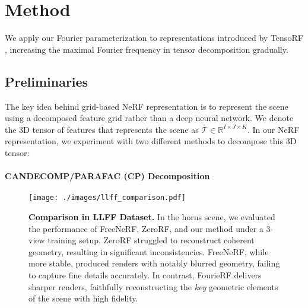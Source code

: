 \section{Method}
\label{sec: method}

We apply our Fourier parameterization to representations introduced by TensoRF \cite{Chen2022ECCV}, increasing the maximal Fourier frequency in tensor decomposition gradually.


\subsection{Preliminaries}


The key idea behind grid-based NeRF representation is to represent the scene using a decomposed feature grid rather than a deep neural network. We denote the 3D tensor of features that represents the scene as $\mathcal{T}\in \mathbb{R}^{I\times J \times K}$. In our NeRF representation, we experiment with two different methods to decompose this 3D tensor:

\vspace{-1em}\paragraph{CANDECOMP/PARAFAC (CP) Decomposition}

\begin{figure*}[t]
    \vspace{-1em}
	\centering
	\texttt{[image: ./images/llff\_comparison.pdf]}
	\caption{\textbf{Comparison in LLFF Dataset.} In the horns scene, we evaluated the performance of FreeNeRF, ZeroRF, and our method under a 3-view training setup. ZeroRF struggled to reconstruct coherent geometry, resulting in significant inconsistencies. FreeNeRF, while more stable, produced renders with notably blurred geometry, failing to capture fine details accurately. In contrast, FourieRF delivers sharper renders, faithfully reconstructing the \textit{key} geometric elements of the scene with high fidelity.}
    \vspace{-1em}
	\label{fig:llff_comparison}
\end{figure*}

